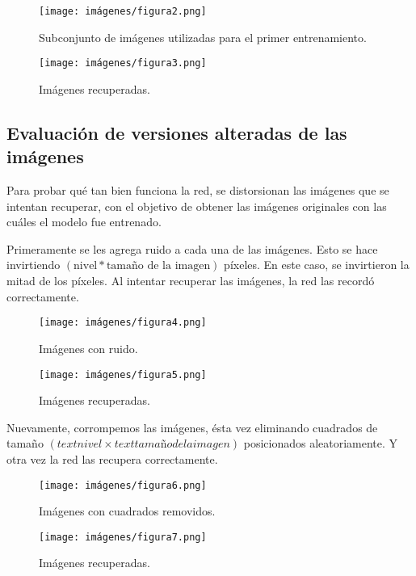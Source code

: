 \documentclass[a4paper,12pt]{article}
\begin{document}
\begin{figure}[!h]
    \centering
    \texttt{[image: imágenes/figura2.png]}
    \caption{Subconjunto de imágenes utilizadas para el primer entrenamiento.}
    \label{fig:figura2}
\end{figure}

\begin{figure}[!h]
    \centering
    \texttt{[image: imágenes/figura3.png]}
    \caption{Imágenes recuperadas.}
    \label{fig:figura3}
\end{figure}

\subsection{Evaluación de versiones alteradas de las imágenes}
Para probar qué tan bien funciona la red, se distorsionan las imágenes que se intentan recuperar, con el objetivo de obtener las imágenes originales con las cuáles el modelo fue entrenado.

Primeramente se les agrega ruido a cada una de las imágenes. Esto se hace invirtiendo $(\text{nivel}*\text{tamaño de la imagen})$ píxeles. En este caso, se invirtieron la mitad de los píxeles. Al intentar recuperar las imágenes, la red las recordó correctamente.

\begin{figure}[!h]
    \centering
    \texttt{[image: imágenes/figura4.png]}
    \caption{Imágenes con ruido.}
    \label{fig:figura4}
\end{figure}

\begin{figure}[!h]
    \centering
    \texttt{[image: imágenes/figura5.png]}
    \caption{Imágenes recuperadas.}
    \label{fig:figura5}
\end{figure}

Nuevamente, corrompemos las imágenes, ésta vez eliminando cuadrados de tamaño $(text{nivel} \times text{tamaño de la imagen})$ posicionados aleatoriamente. Y otra vez la red las recupera correctamente.

\begin{figure}[!h]
    \centering
    \texttt{[image: imágenes/figura6.png]}
    \caption{Imágenes con cuadrados removidos.}
    \label{fig:figura6}
\end{figure}

\begin{figure}[!h]
    \centering
    \texttt{[image: imágenes/figura7.png]}
    \caption{Imágenes recuperadas.}
    \label{fig:figura7}
\end{figure}
\end{document}
